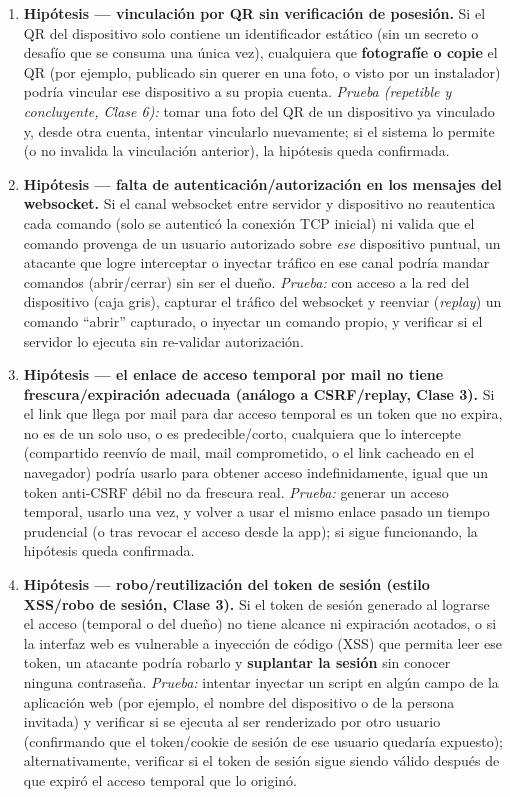 \begin{enumerate}
  \item \textbf{Hipótesis --- vinculación por QR sin verificación de posesión.} Si
  el QR del dispositivo solo contiene un identificador estático (sin un secreto o
  desafío que se consuma una única vez), cualquiera que \textbf{fotografíe o copie}
  el QR (por ejemplo, publicado sin querer en una foto, o visto por un instalador)
  podría vincular ese dispositivo a su propia cuenta. \emph{Prueba (repetible y
  concluyente, Clase 6):} tomar una foto del QR de un dispositivo ya vinculado y,
  desde otra cuenta, intentar vincularlo nuevamente; si el sistema lo permite (o no
  invalida la vinculación anterior), la hipótesis queda confirmada.
  \item \textbf{Hipótesis --- falta de autenticación/autorización en los mensajes
  del websocket.} Si el canal websocket entre servidor y dispositivo no reautentica
  cada comando (solo se autenticó la conexión TCP inicial) ni valida que el comando
  provenga de un usuario autorizado sobre \emph{ese} dispositivo puntual, un
  atacante que logre interceptar o inyectar tráfico en ese canal podría mandar
  comandos (abrir/cerrar) sin ser el dueño. \emph{Prueba:} con acceso a la red del
  dispositivo (caja gris), capturar el tráfico del websocket y reenviar
  (\emph{replay}) un comando ``abrir'' capturado, o inyectar un comando propio, y
  verificar si el servidor lo ejecuta sin re-validar autorización.
  \item \textbf{Hipótesis --- el enlace de acceso temporal por mail no tiene
  frescura/expiración adecuada (análogo a CSRF/replay, Clase 3).} Si el link que
  llega por mail para dar acceso temporal es un token que no expira, no es de un
  solo uso, o es predecible/corto, cualquiera que lo intercepte (compartido reenvío
  de mail, mail comprometido, o el link cacheado en el navegador) podría usarlo
  para obtener acceso indefinidamente, igual que un token anti-CSRF débil no da
  frescura real. \emph{Prueba:} generar un acceso temporal, usarlo una vez, y
  volver a usar el mismo enlace pasado un tiempo prudencial (o tras revocar el
  acceso desde la app); si sigue funcionando, la hipótesis queda confirmada.
  \item \textbf{Hipótesis --- robo/reutilización del token de sesión (estilo
  XSS/robo de sesión, Clase 3).} Si el token de sesión generado al lograrse el
  acceso (temporal o del dueño) no tiene alcance ni expiración acotados, o si la
  interfaz web es vulnerable a inyección de código (XSS) que permita leer ese
  token, un atacante podría robarlo y \textbf{suplantar la sesión} sin conocer
  ninguna contraseña. \emph{Prueba:} intentar inyectar un script en algún campo de
  la aplicación web (por ejemplo, el nombre del dispositivo o de la persona
  invitada) y verificar si se ejecuta al ser renderizado por otro usuario
  (confirmando que el token/cookie de sesión de ese usuario quedaría expuesto);
  alternativamente, verificar si el token de sesión sigue siendo válido después de
  que expiró el acceso temporal que lo originó.
\end{enumerate}

